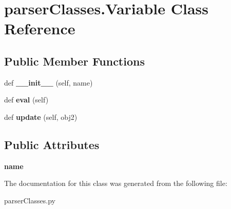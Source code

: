 \hypertarget{classparser_classes_1_1_variable}{}\section{parser\+Classes.\+Variable Class Reference}
\label{classparser_classes_1_1_variable}
\subsection*{Public Member Functions}
\begin{DoxyCompactItemize}
\item 
\mbox{\label{classparser_classes_1_1_variable_a96d789a80a5bcb1246ddcf6ff9a53fd5}} 
def {\bfseries \+\_\+\+\_\+init\+\_\+\+\_\+} (self, name)
\item 
\mbox{\label{classparser_classes_1_1_variable_a252b110790e003233c628e748f620fc1}} 
def {\bfseries eval} (self)
\item 
\mbox{\label{classparser_classes_1_1_variable_a53b0e8b8172450a6d2200161a6706118}} 
def {\bfseries update} (self, obj2)
\end{DoxyCompactItemize}
\subsection*{Public Attributes}
\begin{DoxyCompactItemize}
\item 
\mbox{\label{classparser_classes_1_1_variable_aab7cba9066f629ddacf7c6fc13413979}} 
{\bfseries name}
\end{DoxyCompactItemize}


The documentation for this class was generated from the following file\+:\begin{DoxyCompactItemize}
\item 
parser\+Classes.\+py\end{DoxyCompactItemize}
